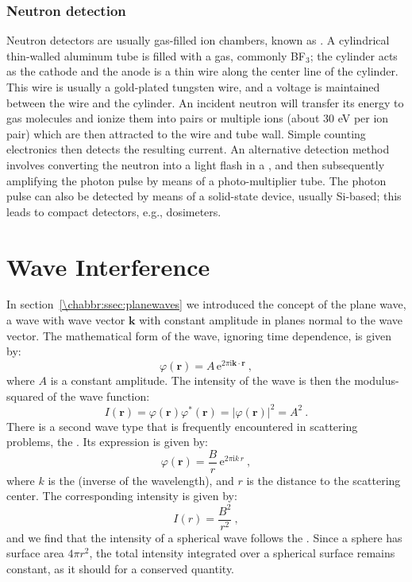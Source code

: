 \subsubsection{Neutron detection}\label{\chabbr:ssec:ndetection}

Neutron detectors  are usually gas-filled ion chambers, known as . A cylindrical thin-walled aluminum tube is filled with a gas, commonly BF$_3$; the cylinder acts as the cathode and the anode is a thin wire along the center line of the cylinder. This wire is usually a gold-plated tungsten wire, and a voltage is maintained between the wire and the cylinder.  An incident neutron will transfer its energy to gas molecules and ionize them into pairs or multiple ions (about $30$ eV per ion pair) which are then attracted to the wire and tube wall. Simple counting electronics then detects the resulting current.  An alternative detection method involves converting the neutron into a light flash in a , and then subsequently amplifying the photon pulse by means of a photo-multiplier tube.  The photon pulse can also be detected by means of a solid-state device, usually Si-based; this leads to compact detectors, e.g., dosimeters.



\section{Wave Interference}\label{\chabbr:sec:interference}

In section~\ref{\chabbr:ssec:planewaves} we introduced the concept of the plane wave, a wave with wave vector $\mathbf{k}$ with constant amplitude in planes normal to the wave vector.  The mathematical form of the wave, ignoring time dependence, is given by:
\[
	\varphi(\mathbf{r}) = A\,\mathrm{e}^{2\pi\mathrm{i}\mathbf{k}\cdot\mathbf{r}}\ ,
\]
where $A$ is a constant amplitude.  The intensity of the wave  is then the modulus-squared of the wave function:
\[
	I(\mathbf{r}) = \varphi(\mathbf{r}) \varphi^{\ast}(\mathbf{r}) = \vert\varphi(\mathbf{r}) \vert^2=A^2\ .
\] 
There is a second wave type that is frequently encountered in scattering problems, the .  Its expression is given by:
\begin{equation}
	\varphi(\mathbf{r}) = \frac{B}{r}\,\mathrm{e}^{2\pi\mathrm{i}k\,r}\ ,
\end{equation}
where $k$ is the  (inverse of the wavelength), and $r$ is the distance to the scattering center.  The corresponding intensity is given by:
\[
	I(r) = \frac{B^2}{r^2}\ ,
\]
and we find that the intensity of a spherical wave follows the .  Since a sphere has surface area $4\pi r^2$, the total intensity integrated over a spherical surface remains constant, as it should for a conserved quantity.

